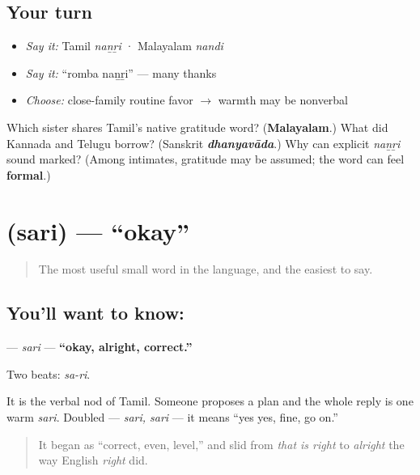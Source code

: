 \subsection*{Your turn}
\begin{itemize}
\raggedright
  \item \emph{Say it:} Tamil \emph{naṉṟi} · Malayalam \emph{nandi}
  \item \emph{Say it:} \textquotedblleft{}romba naṉṟi\textquotedblright{} — many thanks
  \item \emph{Choose:} close-family routine favor $\to$ warmth may be nonverbal
\end{itemize}

\begin{tcolorbox}[breakable,colback=teal!4,colframe=teal!35!black,title={Before you move on}]
Which sister shares Tamil's native gratitude word? (\textbf{Malayalam}.) What did Kannada and Telugu borrow? (Sanskrit \emph{\textbf{dhanyavāda}}.) Why can explicit \emph{naṉṟi} sound marked? (Among intimates, gratitude may be assumed; the word can feel \textbf{formal}.)
\end{tcolorbox}
\section[\texorpdfstring{\ta{சரி} (sari)}{சரி (sari)}]{ (sari) — \textquotedblleft{}okay\textquotedblright{}}

\label{lesson:TA-C01-sari}



\begin{quote}
The most useful small word in the language, and the easiest to say.
\end{quote}

\subsection*{You'll want to know: }
\textbf{} — \emph{sari} — \textbf{\textquotedblleft{}okay, alright, correct.\textquotedblright{}}

Two beats: \emph{sa-ri}.

It is the verbal nod of Tamil. Someone proposes a plan and the whole reply is one warm \emph{sari}. Doubled — \emph{sari, sari} — it means \textquotedblleft{}yes yes, fine, go on.\textquotedblright{}

\begin{quote}
It began as \textquotedblleft{}correct, even, level,\textquotedblright{} and slid from \emph{that is right} to \emph{alright} the way English \emph{right} did.
\end{quote}

